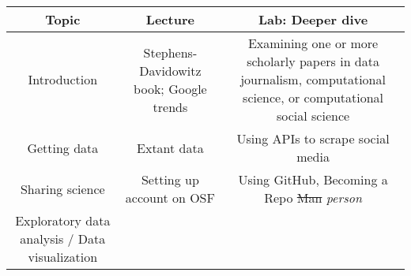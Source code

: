 \documentclass[]{book}
\theoremstyle{definition}
\theoremstyle{definition}
\theoremstyle{definition}
\theoremstyle{remark}
\begin{document}
\begin{longtable}[]{@{}ccc@{}}
\toprule
\begin{minipage}[b]{0.30\columnwidth}\centering
Topic\strut
\end{minipage} & \begin{minipage}[b]{0.30\columnwidth}\centering
Lecture\strut
\end{minipage} & \begin{minipage}[b]{0.30\columnwidth}\centering
Lab: Deeper dive\strut
\end{minipage}\tabularnewline
\midrule
\endhead
\begin{minipage}[t]{0.30\columnwidth}\centering
Introduction\strut
\end{minipage} & \begin{minipage}[t]{0.30\columnwidth}\centering
Stephens-Davidowitz book; Google trends\strut
\end{minipage} & \begin{minipage}[t]{0.30\columnwidth}\centering
Examining one or more scholarly papers in data journalism, computational
science, or computational social science\strut
\end{minipage}\tabularnewline
\begin{minipage}[t]{0.30\columnwidth}\centering
Getting data\strut
\end{minipage} & \begin{minipage}[t]{0.30\columnwidth}\centering
Extant data\strut
\end{minipage} & \begin{minipage}[t]{0.30\columnwidth}\centering
Using APIs to scrape social media\strut
\end{minipage}\tabularnewline
\begin{minipage}[t]{0.30\columnwidth}\centering
Sharing science\strut
\end{minipage} & \begin{minipage}[t]{0.30\columnwidth}\centering
Setting up account on OSF\strut
\end{minipage} & \begin{minipage}[t]{0.30\columnwidth}\centering
Using GitHub, Becoming a Repo \sout{Man} \emph{person}\strut
\end{minipage}\tabularnewline
\begin{minipage}[t]{0.30\columnwidth}\centering
Exploratory data analysis / Data visualization\strut
\end{minipage} & \begin{minipage}[t]{0.30\columnwidth}\centering

\end{minipage}
\end{longtable}
\end{document}
